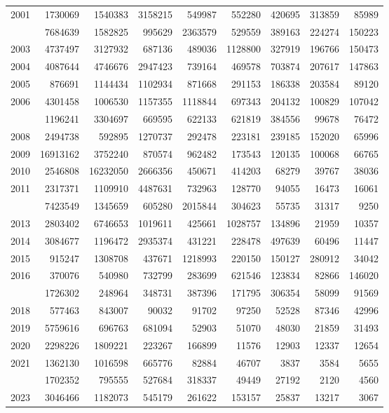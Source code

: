 \documentclass[
]{article}
\begin{document}
\begin{longtable}[t]{lrrrrrrrr}
2001 & 1730069 & 1540383 & 3158215 & 549987 & 552280 & 420695 & 313859 & 85989\\
\addlinespace
2002 & 7684639 & 1582825 & 995629 & 2363579 & 529559 & 389163 & 224274 & 150223\\
2003 & 4737497 & 3127932 & 687136 & 489036 & 1128800 & 327919 & 196766 & 150473\\
2004 & 4087644 & 4746676 & 2947423 & 739164 & 469578 & 703874 & 207617 & 147863\\
2005 & 876691 & 1144434 & 1102934 & 871668 & 291153 & 186338 & 203584 & 89120\\
2006 & 4301458 & 1006530 & 1157355 & 1118844 & 697343 & 204132 & 100829 & 107042\\
\addlinespace
2007 & 1196241 & 3304697 & 669595 & 622133 & 621819 & 384556 & 99678 & 76472\\
2008 & 2494738 & 592895 & 1270737 & 292478 & 223181 & 239185 & 152020 & 65996\\
2009 & 16913162 & 3752240 & 870574 & 962482 & 173543 & 120135 & 100068 & 66765\\
2010 & 2546808 & 16232050 & 2666356 & 450671 & 414203 & 68279 & 39767 & 38036\\
2011 & 2317371 & 1109910 & 4487631 & 732963 & 128770 & 94055 & 16473 & 16061\\
\addlinespace
2012 & 7423549 & 1345659 & 605280 & 2015844 & 304623 & 55735 & 31317 & 9250\\
2013 & 2803402 & 6746653 & 1019611 & 425661 & 1028757 & 134896 & 21959 & 10357\\
2014 & 3084677 & 1196472 & 2935374 & 431221 & 228478 & 497639 & 60496 & 11447\\
2015 & 915247 & 1308708 & 437671 & 1218993 & 220150 & 150127 & 280912 & 34042\\
2016 & 370076 & 540980 & 732799 & 283699 & 621546 & 123834 & 82866 & 146020\\
\addlinespace
2017 & 1726302 & 248964 & 348731 & 387396 & 171795 & 306354 & 58099 & 91569\\
2018 & 577463 & 843007 & 90032 & 91702 & 97250 & 52528 & 87346 & 42996\\
2019 & 5759616 & 696763 & 681094 & 52903 & 51070 & 48030 & 21859 & 31493\\
2020 & 2298226 & 1809221 & 223267 & 166899 & 11576 & 12903 & 12337 & 12654\\
2021 & 1362130 & 1016598 & 665776 & 82884 & 46707 & 3837 & 3584 & 5655\\
\addlinespace
2022 & 1702352 & 795555 & 527684 & 318337 & 49449 & 27192 & 2120 & 4560\\
2023 & 3046466 & 1182073 & 545179 & 261622 & 153157 & 25837 & 13217 & 3067\\*
\end{longtable}
\end{document}
